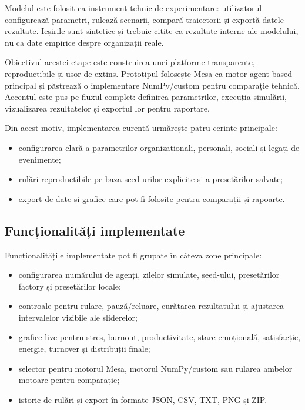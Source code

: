 \documentclass[12pt,a4paper]{article}
\begin{document}
Modelul este folosit ca instrument tehnic de experimentare: utilizatorul configurează parametri, rulează scenarii, compară traiectorii și exportă datele rezultate. Ieșirile sunt sintetice și trebuie citite ca rezultate interne ale modelului, nu ca date empirice despre organizații reale.

Obiectivul acestei etape este construirea unei platforme transparente, reproductibile și ușor de extins. Prototipul folosește Mesa ca motor agent-based principal și păstrează o implementare NumPy/custom pentru comparație tehnică. Accentul este pus pe fluxul complet: definirea parametrilor, execuția simulării, vizualizarea rezultatelor și exportul lor pentru raportare.

Din acest motiv, implementarea curentă urmărește patru cerințe principale:

\begin{itemize}
    \item configurarea clară a parametrilor organizaționali, personali, sociali și legați de evenimente;
    \item rulări reproductibile pe baza seed-urilor explicite și a presetărilor salvate;
    \item export de date și grafice care pot fi folosite pentru comparații și rapoarte.
\end{itemize}

\vspace{0.4cm}
\subsection{Funcționalități implementate}

Funcționalitățile implementate pot fi grupate în câteva zone principale:

\begin{itemize}
    \item configurarea numărului de agenți, zilelor simulate, seed-ului, presetărilor factory și presetărilor locale;
    \item controale pentru rulare, pauză/reluare, curățarea rezultatului și ajustarea intervalelor vizibile ale sliderelor;
    \item grafice live pentru stres, burnout, productivitate, stare emoțională, satisfacție, energie, turnover și distribuții finale;
    \item selector pentru motorul Mesa, motorul NumPy/custom sau rularea ambelor motoare pentru comparație;
    \item istoric de rulări și export în formate JSON, CSV, TXT, PNG și ZIP.
\end{itemize}
\end{document}

